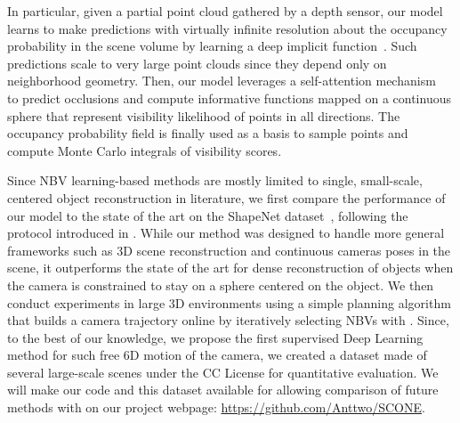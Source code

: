 In particular, given a partial point cloud gathered by a depth sensor, our model learns to make predictions with virtually infinite resolution about the occupancy probability in the scene volume by learning a deep implicit function~\cite{lars-18-occupancy_network, xu-19-disn, mildenhall-20-nerf, yariv-2020-idr, yariv-2021-volsdf, oechsle-21-unisurf}. Such predictions scale to very large point clouds since they depend only on neighborhood geometry. Then, our model leverages a self-attention mechanism~\cite{ashish-2017-attention} to predict occlusions and compute informative functions mapped on a continuous sphere that represent visibility likelihood of points in all directions. The occupancy probability field is finally used as a basis to sample points and compute Monte Carlo integrals of visibility scores.

Since NBV learning-based methods are mostly limited to single, small-scale, centered object reconstruction in literature, we first compare the performance of our model to the state of the art on the ShapeNet dataset~\cite{shapenet2015}, following the protocol introduced in \cite{zeng-icirs20-pcnbv}. While our method was designed to handle more general frameworks such as 3D scene reconstruction and continuous cameras poses in the scene, it outperforms the state of the art for dense reconstruction of objects when the camera is constrained to stay on a sphere centered on the object. We then conduct experiments in large 3D environments using a simple planning algorithm that builds a camera trajectory online by iteratively selecting NBVs with \method.  Since, to the best of our knowledge, we propose the first supervised Deep Learning method for such free 6D motion of the camera, we created a dataset made of several large-scale scenes under the CC License for quantitative evaluation. We will make our code and this dataset available for allowing comparison of future methods with \method on our project webpage: \url{https://github.com/Anttwo/SCONE}.





